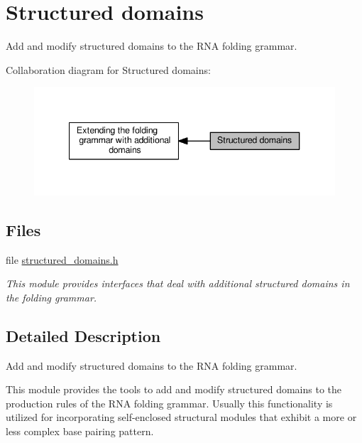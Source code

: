 \hypertarget{group__domains__struc}{}\section{Structured domains}
\label{group__domains__struc}


Add and modify structured domains to the R\+NA folding grammar.  


Collaboration diagram for Structured domains\+:
\nopagebreak
\begin{figure}[H]
\begin{center}
\leavevmode
\includegraphics[width=340pt]{group__domains__struc}
\end{center}
\end{figure}
\subsection*{Files}
\begin{DoxyCompactItemize}
\item 
file \hyperlink{structured__domains_8h}{structured\+\_\+domains.\+h}
\begin{DoxyCompactList}\small\item\em This module provides interfaces that deal with additional structured domains in the folding grammar. \end{DoxyCompactList}\end{DoxyCompactItemize}


\subsection{Detailed Description}
Add and modify structured domains to the R\+NA folding grammar. 

This module provides the tools to add and modify structured domains to the production rules of the R\+NA folding grammar. Usually this functionality is utilized for incorporating self-\/enclosed structural modules that exhibit a more or less complex base pairing pattern. 